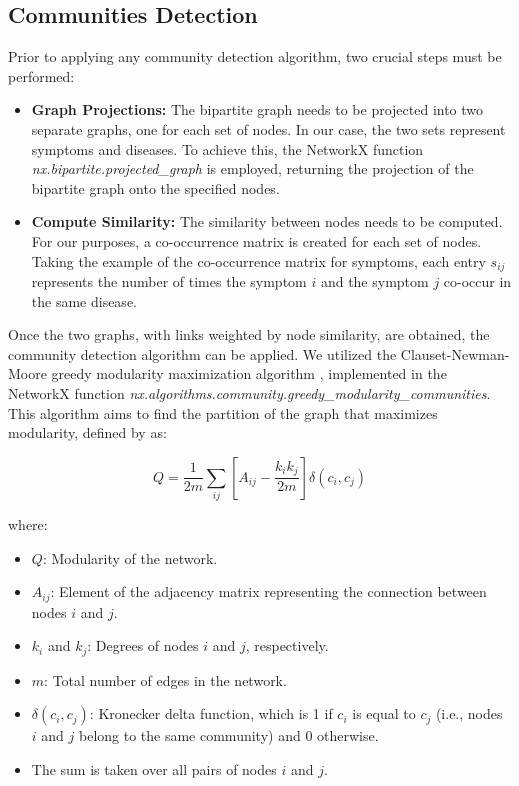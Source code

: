 \subsection{Communities Detection}
Prior to applying any community detection algorithm, two crucial steps must be performed:


\begin{itemize}
  \setlength\itemsep{1em} %
  \item \textbf{Graph Projections:} The bipartite graph needs to be projected into two separate graphs,
        one for each set of nodes. In our case, the two sets represent symptoms and diseases. To achieve this,
        the NetworkX function \textit{nx.bipartite.projected\_graph} is employed, returning the projection of
        the bipartite graph onto the specified nodes.

  \item \textbf{Compute Similarity:} The similarity between nodes needs to be computed. For our purposes,
        a co-occurrence matrix is created for each set of nodes. Taking the example of the co-occurrence matrix
        for symptoms, each entry \(s_{ij}\) represents the number of times the symptom \(i\) and the symptom \(j\)
        co-occur in the same disease.
\end{itemize}

Once the two graphs, with links weighted by node similarity, are obtained, the community detection algorithm
can be applied. We utilized the Clauset-Newman-Moore greedy modularity maximization algorithm \cite{Clauset_Newman_Moore_2004},
implemented in the NetworkX function \textit{nx.algorithms.community.greedy\_modularity\_communities}. This algorithm aims to
find the partition of the graph that maximizes modularity, defined by  \cite{Newman_2006} as:

\begin{equation}
  Q = \frac{1}{2m} \sum_{ij} \left[A_{ij} - \frac{k_i k_j}{2m}\right] \delta(c_i, c_j) \label{eq:modularity}
\end{equation}

where:

\begin{itemize}
  \setlength\itemsep{0.4em} %
  \item \(Q\): Modularity of the network.
  \item \(A_{ij}\): Element of the adjacency matrix representing the connection between nodes \(i\) and \(j\).
  \item \(k_i\) and \(k_j\): Degrees of nodes \(i\) and \(j\), respectively.
  \item \(m\): Total number of edges in the network.
  \item \(\delta(c_i, c_j)\): Kronecker delta function, which is 1 if \(c_i\) is equal to \(c_j\) (i.e., nodes \(i\)
        and \(j\) belong to the same community) and 0 otherwise.
  \item The sum is taken over all pairs of nodes \(i\) and \(j\).
\end{itemize}






